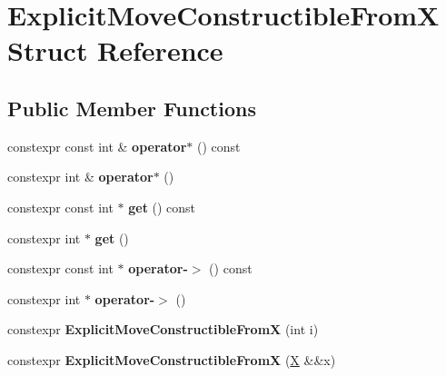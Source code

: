\hypertarget{struct_explicit_move_constructible_from_x}{}\section{Explicit\+Move\+Constructible\+FromX Struct Reference}
\label{struct_explicit_move_constructible_from_x}
\subsection*{Public Member Functions}
\begin{DoxyCompactItemize}
\item 
\mbox{\label{struct_explicit_move_constructible_from_x_a624cedbe2b1aaf62d16f42b7e1e0d2d0}} 
constexpr const int \& {\bfseries operator$\ast$} () const
\item 
\mbox{\label{struct_explicit_move_constructible_from_x_a97d5bb8a8b36b012a4fc0bc739c01473}} 
constexpr int \& {\bfseries operator$\ast$} ()
\item 
\mbox{\label{struct_explicit_move_constructible_from_x_aa90d747a1a031ccb7b60eafb4b187978}} 
constexpr const int $\ast$ {\bfseries get} () const
\item 
\mbox{\label{struct_explicit_move_constructible_from_x_a79361e6fb238d39faf7593c891e60db6}} 
constexpr int $\ast$ {\bfseries get} ()
\item 
\mbox{\label{struct_explicit_move_constructible_from_x_ae10d73291bb6d69dcf00030ff8e89d9d}} 
constexpr const int $\ast$ {\bfseries operator-\/$>$} () const
\item 
\mbox{\label{struct_explicit_move_constructible_from_x_a1ba9c40201306d045248e2d43de4b70c}} 
constexpr int $\ast$ {\bfseries operator-\/$>$} ()
\item 
\mbox{\label{struct_explicit_move_constructible_from_x_accce4676f2608c67dc2dfdcb8497b004}} 
constexpr {\bfseries Explicit\+Move\+Constructible\+FromX} (int i)
\item 
\mbox{\label{struct_explicit_move_constructible_from_x_a78608784a9832970aa392596b2e20e23}} 
constexpr {\bfseries Explicit\+Move\+Constructible\+FromX} (\mbox{\hyperlink{class_x}{X}} \&\&x)
\end{DoxyCompactItemize}
